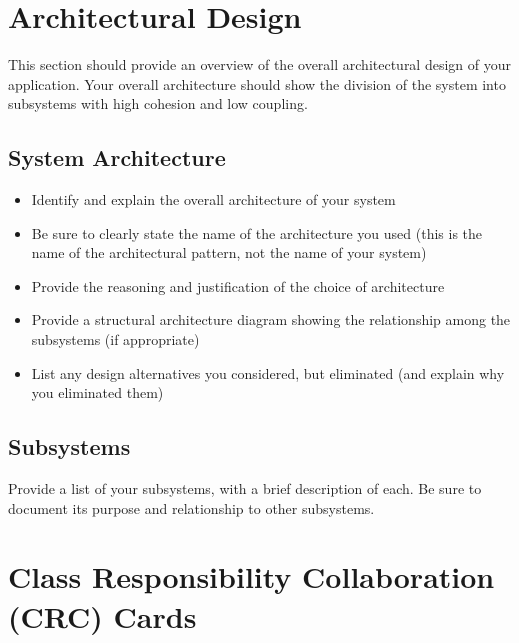 \documentclass[]{article}
\begin{document}


\section{Architectural Design}
\label{sec:architectural_design}
This section should provide an overview of the overall architectural design of your application. Your overall architecture should show the division of the system into subsystems with high cohesion and low coupling.

\subsection{System Architecture}
\label{sub:system_architecture}
\begin{itemize}
	\item Identify and explain the overall architecture of your system
	\item Be sure to clearly state the name of the architecture you used (this is the name of the architectural pattern, not the name of your system)
	\item Provide the reasoning and justification of the choice of architecture
	\item Provide a structural architecture diagram showing the relationship among the subsystems (if appropriate)
	\item List any design alternatives you considered, but eliminated (and explain why you eliminated them)
\end{itemize}

\subsection{Subsystems}
\label{sub:subsystems}
 Provide a list of your subsystems, with a brief description of each. Be sure to document its purpose and relationship to other subsystems.


	
\section{Class Responsibility Collaboration (CRC) Cards}
\label{sec:class_responsibility_collaboration_crc_cards}
\end{document}
